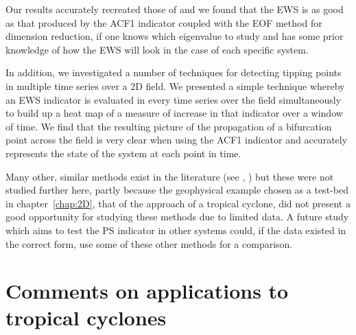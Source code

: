 Our results accurately recreated those of \cite{williamson2015} and we found that the EWS is as good as that produced by the ACF1 indicator coupled with the EOF method for dimension reduction, if one knows which eigenvalue to study and has some prior knowledge of how the EWS will look in the case of each specific system. 

In addition, we investigated a number of techniques for detecting tipping points in multiple time series over a 2D field. We presented a simple technique whereby an EWS indicator is evaluated in every time series over the field simultaneously to build up a heat map of a measure of increase in that indicator over a window of time. We find that the resulting picture of the propagation of a bifurcation point across the field is very clear when using the ACF1 indicator and accurately represents the state of the system at each point in time. 

Many other, similar methods exist in the literature (see \cite{bathiany2013p2}, \cite{kefi2014early}) but these were not studied further here, partly because the geophysical example chosen as a test-bed in chapter~\ref{chap:2D}, that of the approach of a tropical cyclone, did not present a good opportunity for studying these methods due to limited data. A future study which aims to test the PS indicator in other systems could, if the data existed in the correct form, use some of these other methods for a comparison. 





\section{Comments on applications to tropical cyclones}

